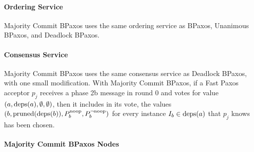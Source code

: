 \paragraph{Ordering Service}
Majority Commit BPaxos uses the same ordering service as BPaxos, Unanimous
BPaxos, and Deadlock BPaxos.

\paragraph{Consensus Service}
Majority Commit BPaxos uses the same consensus service as Deadlock BPaxos, with
one small modification. With Majority Commit BPaxos, if a Fast Paxos acceptor
$p_j$ receives a phase 2b message in round 0 and votes for value $(a, \text{deps}(a),
\emptyset, \emptyset)$, then it includes in its vote, the values $(b,
\text{pruned}(\text{deps}(b)), P^{\text{noop}}_{b}, P^{\lnot \text{noop}}_{b})$ for every instance $I_b \in
\text{deps}(a)$ that $p_j$ knows has been chosen.

\paragraph{Majority Commit BPaxos Nodes}
\newcommand*{\tikzmk}[1]{%
  \tikz[remember picture,overlay,] \node (#1) {};\ignorespaces%
}
\newcommand{\boxit}[1]{%
  \tikz[remember picture,overlay]{%
    \node[%
      yshift=3pt,%
      fill=#1,%
      opacity=.25,%
      fit={(A)($(B)+(.95\linewidth,.8\baselineskip)$)}%
    ] {};
  }\ignorespaces%
}

